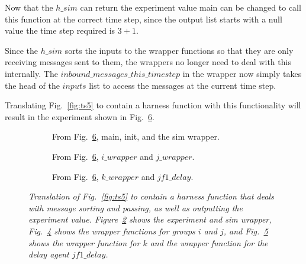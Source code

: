 \documentclass{article}
\begin{document}
Now that the $h\_sim$ can return the experiment value main can be changed to call this function at the correct time step, since the output list starts with a null value the time step required is $3+1$. 

Since the $h\_sim$ sorts the inputs to the wrapper functions so that they are only receiving messages sent to them, the wrappers no longer need to deal with this internally. The $inbound\_messages\_this\_timestep$ in the wrapper now simply takes the head of the $inputs$ list to access the messages at the current time step. 

Translating Fig.~\ref{fig:ts5} to contain a harness function with this functionality will result in the experiment shown in Fig.~\ref{fig:ts6}.
\begin{figure}[H]
	\centering
	\begin{subfigure}[b]{1\textwidth}
	
	\caption{From Fig.~\ref{fig:ts6}, main, init, and the sim wrapper.}
        \label{fig:ts61}
	\end{subfigure}
	\caption*{}
\end{figure}
	
\begin{figure}[H]\ContinuedFloat
	\centering
	\begin{subfigure}[b]{1\textwidth}
	
	\caption{From Fig.~\ref{fig:ts6}, $i\_wrapper$ and $j\_wrapper$.}
        \label{fig:ts62}
	\end{subfigure}
	\caption*{}
\end{figure}
	
\begin{figure}[H]\ContinuedFloat
	\centering
	\begin{subfigure}[b]{1\textwidth}
	
	\caption{From Fig.~\ref{fig:ts6}, $k\_wrapper$ and $jf1\_delay$.}
        \label{fig:ts63}
	\end{subfigure}
	\caption{\it Translation of Fig.~\ref{fig:ts5} to contain a harness function that deals with message sorting and passing, as well as outputting the experiment value. Figure~\ref{fig:ts61} shows the experiment and sim wrapper, Fig.~\ref{fig:ts62} shows the wrapper functions for groups $i$ and $j$, and Fig.~\ref{fig:ts63} shows the wrapper function for $k$ and the wrapper function for the delay agent $jf1\_delay$.}
	\label{fig:ts6}
\end{figure} 
\end{document}
